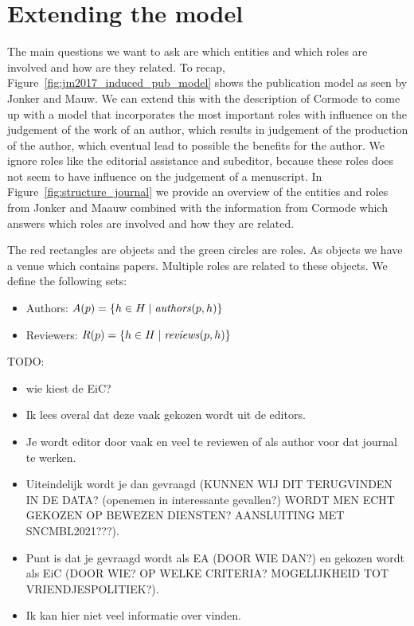 \documentclass{ou-report}
\newcommand{\todo}[1]{{\color{red} TODO: #1}}
\newcommand{\outline}[1]{{\color{blue} #1}}
\begin{document}
\section{Extending the model}
The main questions we want to ask are which entities and which roles are involved and how are they related.
To recap, Figure~\ref{fig:jm2017_induced_pub_model} shows the publication model as seen by Jonker and Mauw. We can extend this with the description of Cormode to come up with a model that incorporates the most important roles with influence on the judgement of the work of an author, which results in judgement of the production of the author, which eventual lead to possible the benefits for the author. We ignore roles like the editorial assistance and subeditor, because these roles does not seem to have influence on the judgement of a menuscript. In Figure~\ref{fig:structure_journal} we provide an overview of the entities and roles from Jonker and Maauw combined with the information from Cormode which answers which roles are involved and how they are related.

The red rectangles are objects and the green circles are roles.
As objects we have a venue which contains papers. Multiple roles are related to these objects.
We define the following sets:
\begin{itemize}
    \item Authors: $A(p) = \{h \in H \mid \mathit{authors}(p, h)\}$
    \item Reviewers: $R(p) = \{h \in H \mid \mathit{reviews}(p, h)\}$
    
\end{itemize}



\todo{
\outline{
\begin{itemize}
    \item wie kiest de EiC?
    \item Ik lees overal dat deze vaak gekozen wordt uit de editors.
    \item Je wordt editor door vaak en veel te reviewen of als author voor dat journal te werken.
    \item Uiteindelijk wordt je dan gevraagd (KUNNEN WIJ DIT TERUGVINDEN IN DE DATA? (openemen in interessante gevallen?) WORDT MEN ECHT GEKOZEN OP BEWEZEN DIENSTEN? AANSLUITING MET SNCMBL2021???).
    \item Punt is dat je gevraagd wordt als EA (DOOR WIE DAN?) en gekozen wordt als EiC (DOOR WIE? OP WELKE CRITERIA? MOGELIJKHEID TOT VRIENDJESPOLITIEK?).
    \item Ik kan hier niet veel informatie over vinden.
\end{itemize}
}
}
\end{document}
